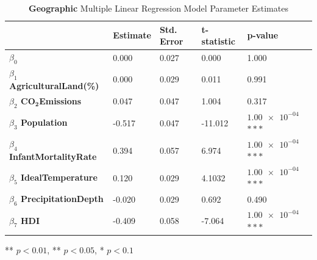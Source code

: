 \documentclass{article}
\begin{document}
\begin{appendices}
\begin{table}[H]
    \centering
        \begin{threeparttable}
            \begin{tabular}{l l l l l}
              \toprule & \textbf{Estimate} & \textbf{Std. Error} & \textbf{t-statistic} & \textbf{p-value} \\ \midrule
            \textbf{$\beta_0$} & 0.000 & 0.027 & 0.000 & 1.000 \\ 
            \textbf{$\beta_1$ AgriculturalLand(\%)} & 0.000 & 0.029 & 0.011 & 0.991  \\ 
            \textbf{$\beta_2$ $\bm{\text{CO}_2}$Emissions} & 0.047 & 0.047 & 1.004 & 0.317 \\ 
            \textbf{$\beta_3$ Population} & -0.517 & 0.047 & -11.012 & $\num{1.00e-04}$ $***$ \\ 
            \textbf{$\beta_4$ InfantMortalityRate} & 0.394 & 0.057 & 6.974 & $\num{1.00e-04}$ $***$ \\ 
            \textbf{$\beta_5$ IdealTemperature} & 0.120 & 0.029 & 4.1032 & $\num{1.00e-04}$ $***$ \\ 
            \textbf{$\beta_6$ PrecipitationDepth} & -0.020 & 0.029 & 0.692 & 0.490 \\ 
            \textbf{$\beta_7$ HDI} & -0.409 & 0.058 & -7.064 & $\num{1.00e-04}$ $***$ \\ \bottomrule
            \end{tabular}
            \begin{tablenotes}
                \small
                \item *** $p < 0.01$, ** $p < 0.05$, * $p < 0.1$
            \end{tablenotes}
        \end{threeparttable}
    \caption{\label{table: descriptivestatsgeographic}\textbf{Geographic} Multiple Linear Regression Model Parameter Estimates}
\end{table}


\end{appendices}
\end{document}
